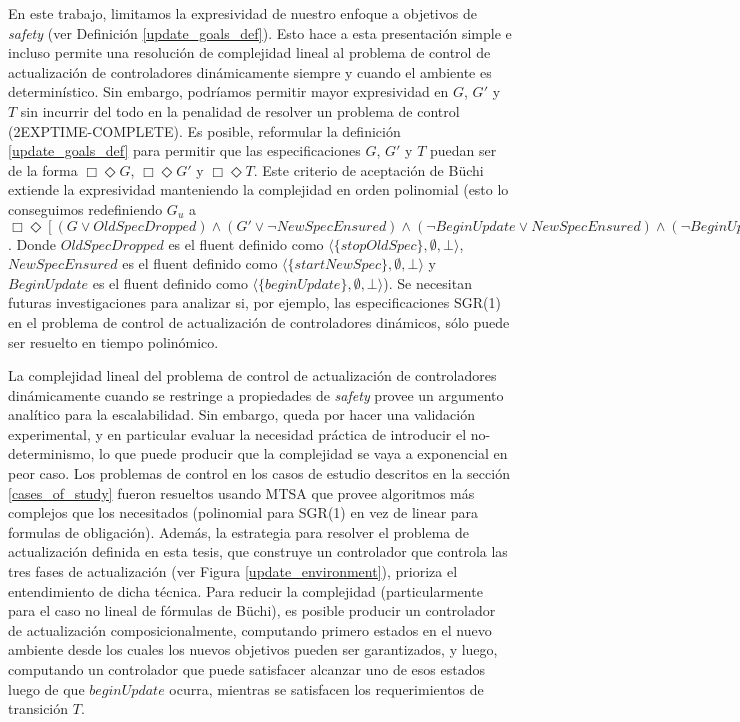 En este trabajo, limitamos la expresividad de nuestro enfoque a objetivos de \emph{safety} (ver Definición
\ref{update_goals_def}). Esto hace a esta presentación simple e incluso permite una resolución de complejidad lineal al
problema de control de actualización de controladores dinámicamente siempre y cuando el ambiente es determinístico. Sin
embargo, podríamos permitir mayor expresividad en $G$, $G'$ y $T$ sin incurrir del todo en la penalidad de resolver un
problema de control (2EXPTIME-COMPLETE). Es posible, reformular la definición \ref{update_goals_def} para permitir que
las especificaciones $G$, $G'$ y $T$ puedan ser de la forma $\Box \Diamond G$, $\Box \Diamond G'$ y $\Box \Diamond T$.
Este criterio de aceptación de Büchi extiende la expresividad manteniendo la complejidad en orden polinomial (esto lo
conseguimos redefiniendo $G_u$ a $\Box \Diamond [(G \lor OldSpecDropped) \wedge (G' \lor \neg NewSpecEnsured) \wedge
(\neg BeginUpdate \lor NewSpecEnsured) \wedge (\neg BeginUpdate \lor  OldSpecDropped) \wedge  T]$. Donde
$OldSpecDropped$ es el fluent definido como $\langle \{stopOldSpec\},\emptyset,\bot\rangle$, $NewSpecEnsured$ es el fluent
definido como $\langle \{startNewSpec\},\emptyset,\bot\rangle$ y $BeginUpdate$ es el fluent definido como $\langle
\{beginUpdate\},\emptyset,\bot\rangle$). Se necesitan futuras investigaciones para analizar si, por ejemplo, las
especificaciones SGR(1) \cite{D'ippolito:2013:SNE:2430536.2430543} en el problema de control de actualización de
controladores dinámicos, sólo puede ser resuelto en tiempo polinómico.

La complejidad lineal del problema de control de actualización de controladores dinámicamente cuando se restringe a
propiedades de \emph{safety} provee un argumento analítico para la escalabilidad. Sin embargo, queda por hacer una
validación experimental, y en particular evaluar la necesidad práctica de introducir el no-determinismo, lo que puede
producir que la complejidad se vaya a exponencial en peor caso. Los problemas de control en los casos de estudio
descritos en la sección \ref{cases_of_study} fueron resueltos usando MTSA que provee algoritmos más complejos que los
necesitados (polinomial para SGR(1) en vez de linear para formulas de obligación). Además, la estrategia para resolver
el problema de actualización definida en esta tesis, que construye un controlador que controla las tres fases de
actualización (ver Figura \ref{update_environment}), prioriza el entendimiento de dicha técnica. Para reducir la
complejidad (particularmente para el caso no lineal de fórmulas de Büchi), es posible producir un controlador de
actualización composicionalmente, computando primero estados en el nuevo ambiente desde los cuales los nuevos objetivos
pueden ser garantizados, y luego, computando un controlador que puede satisfacer alcanzar uno de esos estados luego de
que $beginUpdate$ ocurra, mientras se satisfacen los requerimientos de transición $T$.

